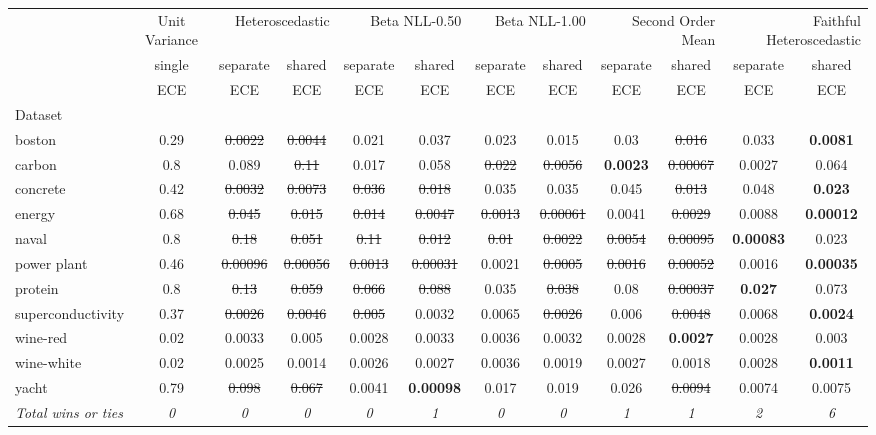 \begin{tabular}{l|c|cc|cc|cc|cc|cc}
\toprule
{} & {Unit Variance} & \multicolumn{2}{r}{Heteroscedastic} & \multicolumn{2}{r}{Beta NLL-0.50} & \multicolumn{2}{r}{Beta NLL-1.00} & \multicolumn{2}{r}{Second Order Mean} & \multicolumn{2}{r}{Faithful Heteroscedastic} \\
{} & {single} & {separate} & {shared} & {separate} & {shared} & {separate} & {shared} & {separate} & {shared} & {separate} & {shared} \\
{} & {ECE} & {ECE} & {ECE} & {ECE} & {ECE} & {ECE} & {ECE} & {ECE} & {ECE} & {ECE} & {ECE} \\
{Dataset} & {} & {} & {} & {} & {} & {} & {} & {} & {} & {} & {} \\
\midrule
boston & 0.29 & \sout{0.0022} & \sout{0.0044} & 0.021 & 0.037 & 0.023 & 0.015 & 0.03 & \sout{0.016} & 0.033 & \textbf{0.0081} \\
carbon & 0.8 & 0.089 & \sout{0.11} & 0.017 & 0.058 & \sout{0.022} & \sout{0.0056} & \textbf{0.0023} & \sout{0.00067} & 0.0027 & 0.064 \\
concrete & 0.42 & \sout{0.0032} & \sout{0.0073} & \sout{0.036} & \sout{0.018} & 0.035 & 0.035 & 0.045 & \sout{0.013} & 0.048 & \textbf{0.023} \\
energy & 0.68 & \sout{0.045} & \sout{0.015} & \sout{0.014} & \sout{0.0047} & \sout{0.0013} & \sout{0.00061} & 0.0041 & \sout{0.0029} & 0.0088 & \textbf{0.00012} \\
naval & 0.8 & \sout{0.18} & \sout{0.051} & \sout{0.11} & \sout{0.012} & \sout{0.01} & \sout{0.0022} & \sout{0.0054} & \sout{0.00095} & \textbf{0.00083} & 0.023 \\
power plant & 0.46 & \sout{0.00096} & \sout{0.00056} & \sout{0.0013} & \sout{0.00031} & 0.0021 & \sout{0.0005} & \sout{0.0016} & \sout{0.00052} & 0.0016 & \textbf{0.00035} \\
protein & 0.8 & \sout{0.13} & \sout{0.059} & \sout{0.066} & \sout{0.088} & 0.035 & \sout{0.038} & 0.08 & \sout{0.00037} & \textbf{0.027} & 0.073 \\
superconductivity & 0.37 & \sout{0.0026} & \sout{0.0046} & \sout{0.005} & 0.0032 & 0.0065 & \sout{0.0026} & 0.006 & \sout{0.0048} & 0.0068 & \textbf{0.0024} \\
wine-red & 0.02 & 0.0033 & 0.005 & 0.0028 & 0.0033 & 0.0036 & 0.0032 & 0.0028 & \textbf{0.0027} & 0.0028 & 0.003 \\
wine-white & 0.02 & 0.0025 & 0.0014 & 0.0026 & 0.0027 & 0.0036 & 0.0019 & 0.0027 & 0.0018 & 0.0028 & \textbf{0.0011} \\
yacht & 0.79 & \sout{0.098} & \sout{0.067} & 0.0041 & \textbf{0.00098} & 0.017 & 0.019 & 0.026 & \sout{0.0094} & 0.0074 & 0.0075 \\
\textit{{Total wins or ties}} & \textit{0} & \textit{0} & \textit{0} & \textit{0} & \textit{1} & \textit{0} & \textit{0} & \textit{1} & \textit{1} & \textit{2} & \textit{6} \\
\bottomrule
\end{tabular}
